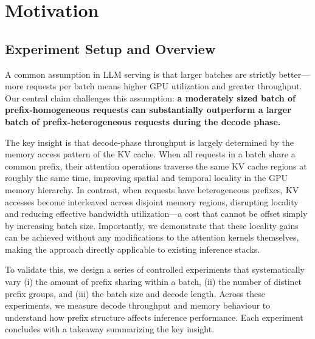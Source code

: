 \section{Motivation}
\label{sec:motivation}
\subsection{Experiment Setup and Overview}

A common assumption in LLM serving is that larger batches are strictly better---more requests per batch means higher GPU utilization and greater throughput. Our central claim challenges this assumption: \textbf{a moderately sized batch of prefix-homogeneous requests can substantially outperform a larger batch of prefix-heterogeneous requests during the decode phase.}

The key insight is that decode-phase throughput is largely determined by the memory access pattern of the KV cache. When all requests in a batch share a common prefix, their attention operations traverse the same KV cache regions at roughly the same time, improving spatial and temporal locality in the GPU memory hierarchy. In contrast, when requests have heterogeneous prefixes, KV accesses become interleaved across disjoint memory regions, disrupting locality and reducing effective bandwidth utilization---a cost that cannot be offset simply by increasing batch size. Importantly, we demonstrate that these locality gains can be achieved without any modifications to the attention kernels themselves, making the approach directly applicable to existing inference stacks.

To validate this, we design a series of controlled experiments that systematically vary (i) the amount of prefix sharing within a batch, (ii) the number of distinct prefix groups, and (iii) the batch size and decode length. Across these experiments, we measure decode throughput and memory behaviour to understand how prefix structure affects inference performance. Each experiment concludes with a takeaway summarizing the key insight.

